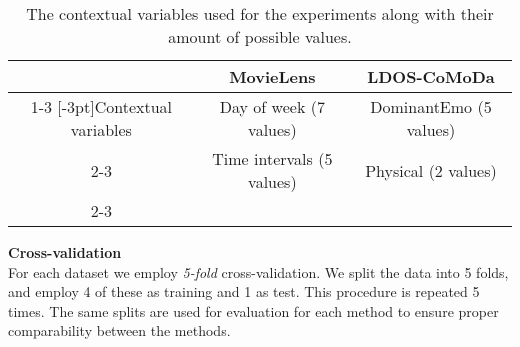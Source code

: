 \begin{table*}[]\centering
    \caption{The contextual variables used for the experiments along with their amount of possible values.}\label{tbl:contextprotocol}
    \scriptsize
    \begin{tabular}{ccc}\toprule
         & \textbf{MovieLens} & \textbf{LDOS-CoMoDa}\\\cmidrule{1-3}
         \multirow{2}{*}[-3pt]{Contextual variables} & Day of week (7 values) & DominantEmo (5 values)\\\cmidrule{2-3}
         & Time intervals (5 values) & Physical (2 values) \\\cmidrule{2-3}
    \bottomrule
    \end{tabular}
\end{table*}

\noindent
\textbf{Cross-validation}\\
For each dataset we employ \textit{5-fold} cross-validation.
We split the data into 5 folds, and employ 4 of these as training and 1 as test.
This procedure is repeated 5 times.
The same splits are used for evaluation for each method to ensure proper comparability between the methods.

